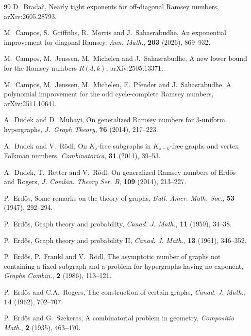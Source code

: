 \documentclass[12pt,reqno]{amsart}
\theoremstyle{remark}
\numberwithin{theorem}{section}
\renewcommand{\(}{\bigl(}
\renewcommand{\)}{\bigr)\vphantom{)}}
\begin{document}
\begin{thebibliography}{99}
 D.~Brada\v{c}, Nearly tight exponents for off-diagonal Ramsey numbers, arXiv:2605.28793.

 M.~Campos, S.~Griffiths, R.~Morris and J.~Sahasrabudhe, An exponential improvement for diagonal Ramsey, \emph{Ann. Math.}, \textbf{203} (2026), 869--932.

 M.~Campos, M.~Jenssen, M.~Michelen and J.~Sahasrabudhe, A new lower bound for the Ramsey numbers $R(3,k)$, arXiv:2505.13371.

 M.~Campos, M.~Jenssen, M.~Michelen, F.~Pfender and J.~Sahasrabudhe, A polynomial improvement for the odd cycle-complete Ramsey numbers, arXiv:2511.10641.


 A.~Dudek and D.~Mubayi, On generalized Ramsey numbers for $3$-uniform hypergraphs, \emph{J.~Graph Theory}, \textbf{76} (2014), 217--223.

 A.~Dudek and V.~R\"odl, On $K_s$-free subgraphs in $K_{s+k}$-free graphs and vertex Folkman numbers, \emph{Combinatorica}, \textbf{31} (2011), 39--53.

 A.~Dudek, T.~Retter and V.~R\"odl, On generalized Ramsey numbers of Erd\H{o}s and Rogers, \emph{J. Combin. Theory Ser. B}, \textbf{109} (2014), 213--227.

 P.~Erd\H{o}s, Some remarks on the theory of graphs, \emph{Bull. Amer. Math. Soc.}, \textbf{53} (1947), 292--294.

 P.~Erd\H{o}s, Graph theory and probability, \emph{Canad. J. Math.}, \textbf{11} (1959), 34--38.

 P.~Erd\H{o}s, Graph theory and probability II, \emph{Canad. J. Math.}, \textbf{13} (1961), 346--352.

 P.~Erd\H{o}s, P.~Frankl and V.~R\"odl, The asymptotic number of graphs not containing a fixed subgraph and a problem for hypergraphs having no exponent, \emph{Graphs Combin.}, \textbf{2} (1986), 113--121.

 P.~Erd\H{o}s and C.A.~Rogers, The construction of certain graphs, \emph{Canad. J. Math.}, \textbf{14} (1962), 702--707.

 P.~Erd\H{o}s and G.~Szekeres, A combinatorial problem in geometry, \emph{Compositio Math.}, \textbf{2} (1935), 463--470.


\end{thebibliography}
\end{document}
